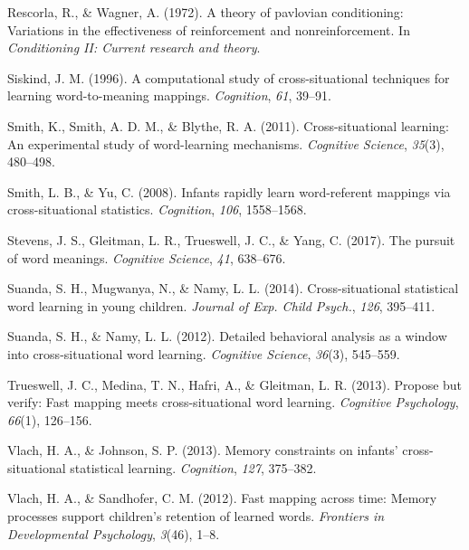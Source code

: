 \documentclass[10pt, letterpaper]{article}
\newenvironment{CSLReferences}%
  {}%
  {\par}
\begin{document}
\begin{CSLReferences}{1}{0}
\leavevmode{}%
Rescorla, R., \& Wagner, A. (1972). A theory of pavlovian conditioning:
Variations in the effectiveness of reinforcement and nonreinforcement.
In \emph{Conditioning II: Current research and theory}.

\leavevmode{}%
Siskind, J. M. (1996). {A computational study of cross-situational
techniques for learning word-to-meaning mappings}. \emph{Cognition},
\emph{61}, 39--91.

\leavevmode{}%
Smith, K., Smith, A. D. M., \& Blythe, R. A. (2011). {Cross-situational
learning: An experimental study of word-learning mechanisms}.
\emph{Cognitive Science}, \emph{35}(3), 480--498.

\leavevmode{}%
Smith, L. B., \& Yu, C. (2008). {Infants rapidly learn word-referent
mappings via cross-situational statistics}. \emph{Cognition},
\emph{106}, 1558--1568.

\leavevmode{}%
Stevens, J. S., Gleitman, L. R., Trueswell, J. C., \& Yang, C. (2017).
The pursuit of word meanings. \emph{Cognitive Science}, \emph{41},
638--676.

\leavevmode{}%
Suanda, S. H., Mugwanya, N., \& Namy, L. L. (2014). Cross-situational
statistical word learning in young children. \emph{{Journal of Exp.
Child Psych.}}, \emph{126}, 395--411.

\leavevmode{}%
Suanda, S. H., \& Namy, L. L. (2012). {Detailed behavioral analysis as a
window into cross-situational word learning}. \emph{Cognitive Science},
\emph{36}(3), 545--559.

\leavevmode{}%
Trueswell, J. C., Medina, T. N., Hafri, A., \& Gleitman, L. R. (2013).
Propose but verify: Fast mapping meets cross-situational word learning.
\emph{Cognitive Psychology}, \emph{66}(1), 126--156.

\leavevmode{}%
Vlach, H. A., \& Johnson, S. P. (2013). Memory constraints on infants'
cross-situational statistical learning. \emph{Cognition}, \emph{127},
375--382.

\leavevmode{}%
Vlach, H. A., \& Sandhofer, C. M. (2012). {Fast mapping across time:
Memory processes support children's retention of learned words}.
\emph{Frontiers in Developmental Psychology}, \emph{3}(46), 1--8.


\end{CSLReferences}
\end{document}
